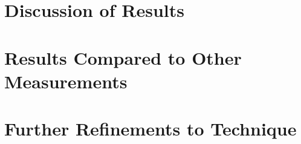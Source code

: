 \documentclass[main.tex]{subfiles}
\begin{document}
\section{Discussion of Results}
\section{Results Compared to Other Measurements}
\section{Further Refinements to Technique}
\end{document}
